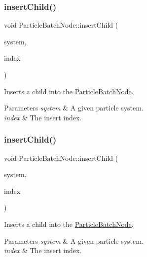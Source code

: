 \subsubsection{\texorpdfstring{insert\+Child()}{insertChild()}\hspace{0.1cm}{\footnotesize\ttfamily [1/2]}}
{\footnotesize\ttfamily void Particle\+Batch\+Node\+::insert\+Child (\begin{DoxyParamCaption}\item[{\hyperlink{classParticleSystem}{Particle\+System} $\ast$}]{system,  }\item[{int}]{index }\end{DoxyParamCaption})}

Inserts a child into the \hyperlink{classParticleBatchNode}{Particle\+Batch\+Node}.


\begin{DoxyParams}{Parameters}
{\em system} & A given particle system. \\
\hline
{\em index} & The insert index. \\
\hline
\end{DoxyParams}
\mbox{\label{classParticleBatchNode_a1d1efda71101dc032ffee3e24ee1a61e}} 
\subsubsection{\texorpdfstring{insert\+Child()}{insertChild()}\hspace{0.1cm}{\footnotesize\ttfamily [2/2]}}
{\footnotesize\ttfamily void Particle\+Batch\+Node\+::insert\+Child (\begin{DoxyParamCaption}\item[{\hyperlink{classParticleSystem}{Particle\+System} $\ast$}]{system,  }\item[{int}]{index }\end{DoxyParamCaption})}

Inserts a child into the \hyperlink{classParticleBatchNode}{Particle\+Batch\+Node}.


\begin{DoxyParams}{Parameters}
{\em system} & A given particle system. \\
\hline
{\em index} & The insert index. \\
\hline
\end{DoxyParams}
\mbox{\label{classParticleBatchNode_ac4875ff56dadd5f836d9b99a36201bb1}} 
